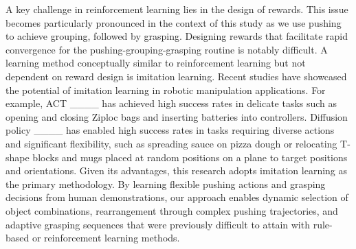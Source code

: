 A key challenge in reinforcement learning lies in the design of rewards. This issue becomes particularly pronounced in the context of this study as we use pushing to achieve grouping, followed by grasping. Designing rewards that facilitate rapid convergence for the pushing-grouping-grasping routine is notably difficult. A learning method conceptually similar to reinforcement learning but not dependent on reward design is imitation learning. Recent studies have showcased the potential of imitation learning in robotic manipulation applications. For example, ACT ____ has achieved high success rates in delicate tasks such as opening and closing Ziploc bags and inserting batteries into controllers. Diffusion policy ____ has enabled high success rates in tasks requiring diverse actions and significant flexibility, such as spreading sauce on pizza dough or relocating T-shape blocks and mugs placed at random positions on a plane to target positions and orientations. Given its advantages, this research adopts imitation learning as the primary methodology. By learning flexible pushing actions and grasping decisions from human demonstrations, our approach enables dynamic selection of object combinations, rearrangement through complex pushing trajectories, and adaptive grasping sequences that were previously difficult to attain with rule-based or reinforcement learning methods.